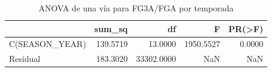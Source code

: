 \begin{table}
\caption{ANOVA de una vía para FG3A/FGA por temporada}
\label{tab:anova-fg3}
\begin{tabular}{lrrrr}
\toprule
 & sum_sq & df & F & PR(>F) \\
\midrule
C(SEASON_YEAR) & 139.5719 & 13.0000 & 1950.5527 & 0.0000 \\
Residual & 183.3020 & 33302.0000 & NaN & NaN \\
\bottomrule
\end{tabular}
\end{table}
